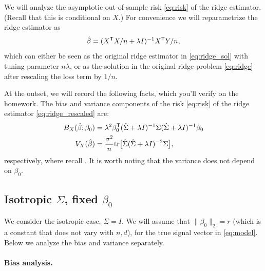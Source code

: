 \documentclass{article}
\begin{document}
We will analyze the asymptotic out-of-sample risk \eqref{eq:risk} of the ridge
estimator. (Recall that this is conditional on $X$.) For convenience we will
reparametrize the ridge estimator as    
\begin{equation}
\label{eq:ridge_rescaled}
\hat{\beta} = (X^{\mathsf{T}} X/n + \lambda I)^{-1} X^{\mathsf{T}} Y/n,
\end{equation}
which can either be seen as the original ridge estimator in \eqref{eq:ridge_sol} 
with tuning parameter $n\lambda$, or as the solution in the original ridge
problem \eqref{eq:ridge} after rescaling the loss term by $1/n$.  

At the outset, we will record the following facts, which you'll verify on the
homework. The bias and variance components of the risk \eqref{eq:risk} of the
ridge estimator \eqref{eq:ridge_rescaled} are:     
\begin{align}
\label{eq:ridge_bias}
B_X(\hat{\beta}; \beta_0) &= \lambda^2 \beta_0^{\mathsf{T}} (\hat\Sigma + \lambda I)^{-1}
  \Sigma (\hat\Sigma + \lambda I)^{-1} \beta_0 \\ 
\label{eq:ridge_var}
V_X(\hat{\beta}) &= \frac{\sigma^2}{n} \mathrm{tr} \big[ \hat\Sigma ( \hat\Sigma + \lambda
  I)^{-2} \Sigma \big],
\end{align}
respectively, where recall . It is worth noting that
the variance does not depend on $\beta_0$. 

\subsection{Isotropic $\Sigma$, fixed $\beta_0$}

We consider the isotropic case, $\Sigma = I$. We will assume that $\|\beta_0\|_2
= r$ (which is a constant that does not vary with $n,d$), for the true signal
vector in \eqref{eq:model}. Below we analyze the bias and variance separately. 

\paragraph{Bias analysis.}
\end{document}
